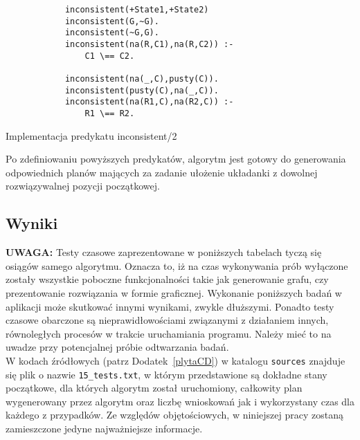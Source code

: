     \begin{listing}[H]
        \begin{verbatim}
            inconsistent(+State1,+State2)
            inconsistent(G,~G).
            inconsistent(~G,G).
            inconsistent(na(R,C1),na(R,C2)) :-
                C1 \== C2.
            
            inconsistent(na(_,C),pusty(C)).
            inconsistent(pusty(C),na(_,C)).
            inconsistent(na(R1,C),na(R2,C)) :-
                R1 \== R2.
        \end{verbatim}
    \caption{Implementacja predykatu inconsistent/2}
    \end{listing}

    Po zdefiniowaniu powyższych predykatów, algorytm jest gotowy do generowania odpowiednich planów mających za zadanie ułożenie 
    układanki z dowolnej rozwiązywalnej pozycji początkowej.
    \subsection{Wyniki}

    \textbf{UWAGA:} Testy czasowe zaprezentowane w poniższych tabelach tyczą się osiągów samego algorytmu. Oznacza to, iż na czas wykonywania prób
    wyłączone zostały wszystkie poboczne funkcjonalności takie jak generowanie grafu, czy prezentowanie rozwiązania w formie graficznej. 
    Wykonanie poniższych badań w aplikacji może skutkować innymi wynikami, zwykle dłuższymi. Ponadto testy czasowe obarczone są nieprawidłowościami 
    związanymi z działaniem innych, równoległych procesów w trakcie uruchamiania programu. Należy mieć to na uwadze przy potencjalnej 
    próbie odtwarzania badań. \\
    W kodach źródłowych (patrz Dodatek~\ref{plytaCD}) w katalogu \texttt{sources} znajduje się plik o nazwie \texttt{15\_tests.txt}, w którym 
    przedstawione są dokładne stany początkowe, dla których algorytm został uruchomiony, całkowity plan wygenerowany przez algorytm oraz 
    liczbę wnioskowań jak i wykorzystany czas dla każdego z przypadków. Ze względów objętościowych, w niniejszej pracy zostaną zamieszczone 
    jedyne najważniejsze informacje.

